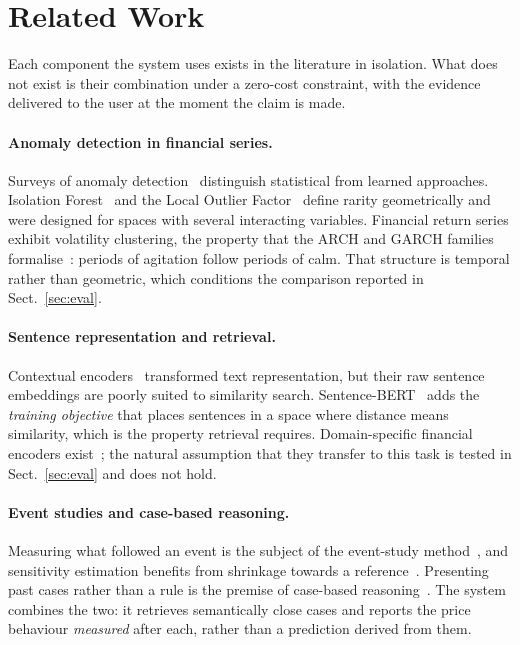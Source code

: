 \documentclass[runningheads]{llncs}
\begin{document}
\section{Related Work}

Each component the system uses exists in the literature in isolation. What does not exist
is their combination under a zero-cost constraint, with the evidence delivered to the user
at the moment the claim is made.

\paragraph{Anomaly detection in financial series.} Surveys of anomaly
detection~\cite{chandola2009anomaly} distinguish statistical from learned approaches.
Isolation Forest~\cite{liu2008isolation} and the Local Outlier
Factor~\cite{breunig2000lof} define rarity geometrically and were designed for spaces with
several interacting variables. Financial return series exhibit volatility clustering, the
property that the ARCH and GARCH families formalise~\cite{engle1982arch,bollerslev1986garch}: periods of agitation follow periods of calm. That structure is
temporal rather than geometric, which conditions the comparison reported in
Sect.~\ref{sec:eval}.

\paragraph{Sentence representation and retrieval.} Contextual encoders~\cite{devlin2019bert}
transformed text representation, but their raw sentence embeddings are poorly suited to
similarity search. Sentence-BERT~\cite{reimers2019sbert} adds the \emph{training
objective} that places sentences in a space where distance means similarity, which is the
property retrieval requires. Domain-specific financial encoders exist~\cite{liu2020finbert,huang2023finbert}; the natural assumption that they transfer to this task is tested in
Sect.~\ref{sec:eval} and does not hold.

\paragraph{Event studies and case-based reasoning.} Measuring what followed an event is the
subject of the event-study method~\cite{brown1985daily}, and sensitivity estimation
benefits from shrinkage towards a reference~\cite{vasicek1973beta}. Presenting past cases
rather than a rule is the premise of case-based reasoning~\cite{aamodt1994cbr}. The system
combines the two: it retrieves semantically close cases and reports the price behaviour
\emph{measured} after each, rather than a prediction derived from them.
\end{document}
